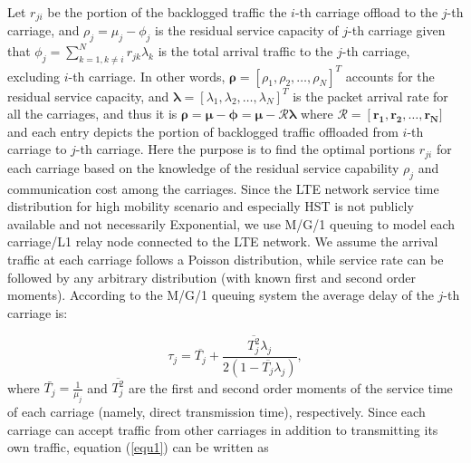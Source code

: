 \documentclass[journal]{IEEEtran}
\begin{document}
{ Let $r_{ji}$ be the portion of the backlogged traffic the $i$-th carriage offload to the $j$-th carriage, and $\rho_{j}=\mu_{j}-\phi_{j}$ is the residual service capacity of $j$-th carriage given that $\phi_{j}=\sum_{k=1, k\neq i}^{N} r_{jk}\lambda_{k}$ is the total arrival traffic to the $j$-th carriage, excluding $i$-th carriage. In other words, $\boldsymbol{\rho}=\left[\rho_{1},\rho_{2},\dots,\rho_{N}\right]^{T}$ accounts for the residual service capacity, and $\boldsymbol{\lambda}=\left[\lambda_{1},\lambda_{2},\dots,\lambda_{N}\right]^{T}$ is the packet arrival rate for all the carriages, and thus it is $\boldsymbol{\rho} = \boldsymbol{\mu}-\boldsymbol{\phi} = \boldsymbol{\mu}-\mathcal{R}\boldsymbol{\lambda}$ where $\mathcal{R}=\left[\boldsymbol{r_{1},\boldsymbol{r_{2}},\dots,\boldsymbol{r_{N}}}]$ and each entry depicts the portion of backlogged traffic offloaded from $i$-th carriage to $j$-th carriage. Here the purpose is to find the optimal portions $r_{ji}$ for each carriage based on the knowledge of the residual service capability $\rho_{j}$ and communication cost among the carriages. 
 Since the LTE network service time distribution for high mobility scenario and especially HST is not publicly available and not necessarily Exponential, we use M/G/1 queuing to model each carriage/L1 relay node connected to the LTE network. We assume the arrival traffic at each carriage follows a Poisson distribution, while service rate can be followed by any arbitrary distribution (with known first and second order moments). According to the M/G/1 queuing system the average delay of the $j$-th carriage is:
 
 
\begin{equation}
\tau_j  = \overline{T_j} + \frac{\overline{T_j^2}\lambda_j}{2(1-\overline{T_j}\lambda_j)},
\label{equ1}
\end{equation}
\noindent
where $\bar{T_j}=\frac{1}{\mu_j}$ and $\overline{T_j^2}$ are the first and second order moments of the service time of each carriage (namely, direct transmission time), respectively. Since each carriage can accept traffic from other carriages in addition to transmitting its own traffic, equation (\ref{equ1}) can be written as 

}
\end{document}
